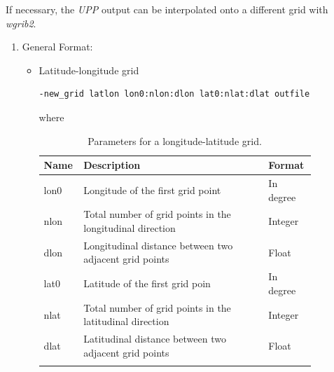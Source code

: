 \documentclass[11pt,fleqn]{report}              %
\begin{document}
\begin{enumerate}
If necessary, the {\it UPP} output can be interpolated onto a different grid with {\it wgrib2}.

\begin{enumerate}
\item General Format:
\begin{itemize}
\item Latitude-longitude grid
\lstset{language=bash}   
\begin{lstlisting}[frame=trBL]
-new_grid latlon lon0:nlon:dlon lat0:nlat:dlat outfile
\end{lstlisting}
where
{
\fontsize{10}{12}\selectfont
\begin{longtable}{ p{0.08\linewidth} | p{0.65\linewidth} | p{0.12\linewidth} }
\hline
\hline
 Name & Description & Format \\
\hline
 lon0 & Longitude of the first grid point & In degree \\
 nlon & Total number of grid points in the longitudinal direction & Integer \\
 dlon & Longitudinal distance between two adjacent grid points & Float \\
 lat0 & Latitude of the first grid poin & In degree \\
 nlat & Total number of grid points in the latitudinal direction & Integer \\
 dlat & Latitudinal distance between two adjacent grid points & Float \\
\hline
\caption{Parameters for a longitude-latitude grid.}
\label{table:fv3grid_LL}
\end{longtable}
}


\end{itemize}
\end{enumerate}
\end{enumerate}
\end{document}
